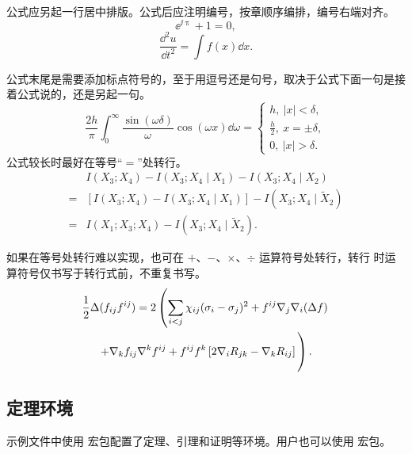 公式应另起一行居中排版。公式后应注明编号，按章顺序编排，编号右端对齐。
\begin{equation}
  \ee^{\ii\uppi} + 1 = 0,
\end{equation}
\begin{equation}
  \frac{\dd^2 u}{\dd t^2} = \int f(x) \dd x.
\end{equation}

公式末尾是需要添加标点符号的，至于用逗号还是句号，取决于公式下面一句是接着公式说的，还是另起一句。
\begin{equation}
		\frac{2h}{\pi}\int_{0}^{\infty}\frac{\sin\left( \omega\delta \right)}{\omega}
		\cos\left( \omega x \right) \dd\omega = 
		\begin{cases}
				h, \ \left| x \right| < \delta, \\
				\frac{h}{2}, \ x = \pm \delta, \\
				0, \ \left| x \right| > \delta.
		\end{cases}
\end{equation}
公式较长时最好在等号“$=$”处转行。
\begin{align}
    & I (X_3; X_4) - I (X_3; X_4 \mid X_1) - I (X_3; X_4 \mid X_2) \nonumber \\
  = & [I (X_3; X_4) - I (X_3; X_4 \mid X_1)] - I (X_3; X_4 \mid \tilde{X}_2) \\
  = & I (X_1; X_3; X_4) - I (X_3; X_4 \mid \tilde{X}_2).
\end{align}

如果在等号处转行难以实现，也可在 $+$、$-$、$\times$、$\div$ 运算符号处转行，转行
时运算符号仅书写于转行式前，不重复书写。
\begin{multline}
  \frac{1}{2} \Delta (f_{ij} f^{ij}) =
    2 \left(\sum_{i<j} \chi_{ij}(\sigma_{i} - \sigma_{j})^{2}
    + f^{ij} \nabla_{j} \nabla_{i} (\Delta f) \right. \\
  \left. + \nabla_{k} f_{ij} \nabla^{k} f^{ij} +
    f^{ij} f^{k} \left[2\nabla_{i}R_{jk}
    - \nabla_{k} R_{ij} \right] \vphantom{\sum_{i<j}} \right).
\end{multline}

\subsection{定理环境}

示例文件中使用  宏包配置了定理、引理和证明等环境。用户也可以使用
 宏包。

